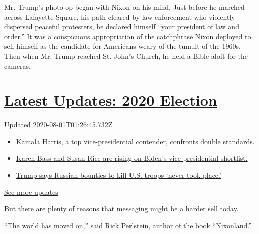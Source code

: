 Mr. Trump's photo op began with Nixon on his mind. Just before he
marched across Lafayette Square, his path cleared by law enforcement who
violently dispersed peaceful protesters, he declared himself ``your
president of law and order.'' It was a conspicuous appropriation of the
catchphrase Nixon deployed to sell himself as the candidate for
Americans weary of the tumult of the 1960s. Then when Mr. Trump reached
St. John's Church, he held a Bible aloft for the cameras.

\hypertarget{latest-updates-2020-election}{%
\section{\texorpdfstring{\href{https://www.nytimes.com/2020/07/31/us/elections/biden-vs-trump.html?action=click\&pgtype=Article\&state=default\&region=MAIN_CONTENT_1\&context=storylines_live_updates}{Latest
Updates: 2020
Election}}{Latest Updates: 2020 Election}}\label{latest-updates-2020-election}}

Updated 2020-08-01T01:26:45.732Z

\begin{itemize}
\tightlist
\item
  \href{https://www.nytimes.com/2020/07/31/us/elections/biden-vs-trump.html?action=click\&pgtype=Article\&state=default\&region=MAIN_CONTENT_1\&context=storylines_live_updates\#link-29fdff45}{Kamala
  Harris, a top vice-presidential contender, confronts double
  standards.}
\item
  \href{https://www.nytimes.com/2020/07/31/us/elections/biden-vs-trump.html?action=click\&pgtype=Article\&state=default\&region=MAIN_CONTENT_1\&context=storylines_live_updates\#link-13ec3d9c}{Karen
  Bass and Susan Rice are rising on Biden's vice-presidential
  shortlist.}
\item
  \href{https://www.nytimes.com/2020/07/31/us/elections/biden-vs-trump.html?action=click\&pgtype=Article\&state=default\&region=MAIN_CONTENT_1\&context=storylines_live_updates\#link-49e9a016}{Trump
  says Russian bounties to kill U.S. troops `never took place.'}
\end{itemize}

\href{https://www.nytimes.com/2020/07/31/us/elections/biden-vs-trump.html?action=click\&pgtype=Article\&state=default\&region=MAIN_CONTENT_1\&context=storylines_live_updates}{See
more updates}

But there are plenty of reasons that messaging might be a harder sell
today.

``The world has moved on,'' said Rick Perlstein, author of the book
``Nixonland.''


